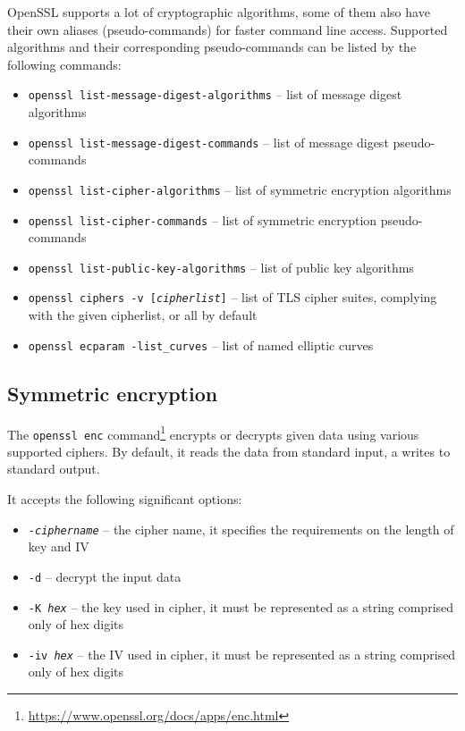 OpenSSL supports a lot of cryptographic algorithms, some of them also have their own aliases (pseudo-commands) for faster command line access. Supported algorithms and their corresponding pseudo-commands can be listed by the following commands:

\begin{itemize}
  \item \texttt{openssl list-message-digest-algorithms} -- list of message digest algorithms
  \item \texttt{openssl list-message-digest-commands} -- list of message digest pseudo-commands
  \item \texttt{openssl list-cipher-algorithms} -- list of symmetric encryption algorithms
  \item \texttt{openssl list-cipher-commands} -- list of symmetric encryption pseudo-commands
  \item \texttt{openssl list-public-key-algorithms} -- list of public key algorithms
  \item \texttt{openssl ciphers -v [\textit{cipherlist}]} -- list of TLS cipher suites, complying with the given cipherlist, or all by default
  \item \texttt{openssl ecparam -list\_curves} -- list of named elliptic curves
\end{itemize}


\subsection{Symmetric encryption}
\label{toc/openssl-enc}

The \texttt{openssl enc} command\footnote{\url{https://www.openssl.org/docs/apps/enc.html}} encrypts or decrypts given data using various supported ciphers. By default, it reads the data from standard input, a writes to standard output.

It accepts the following significant options:

\begin{itemize}
  \item \texttt{-\textit{ciphername}} -- the cipher name, it specifies the requirements on the length of key and IV
  \item \texttt{-d} -- decrypt the input data
  \item \texttt{-K \textit{hex}} -- the key used in cipher, it must be represented as a string comprised only of hex digits
  \item \texttt{-iv \textit{hex}} -- the IV used in cipher, it must be represented as a string comprised only of hex digits
\end{itemize}

